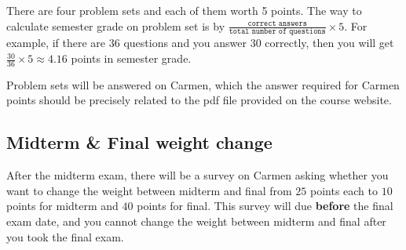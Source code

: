 \documentclass[12pt]{article}
\begin{document}
There are four problem sets and each of them worth 5 points.
The way to calculate semester grade on problem set is by $ \frac{ \texttt{correct answers} }{ \texttt{total number of questions} } \times 5 $.
For example, if there are 36 questions and you answer 30 correctly, then you will get $ \frac{30}{36} \times 5 \approx 4.16$ points in semester grade.


Problem sets will be answered on Carmen, which the answer required for Carmen points should be precisely related to the pdf file provided on the course website.

\subsection*{Midterm \& Final weight change}
\label{sub:Midterm____Final_weight_change}

After the midterm exam, there will be a survey on Carmen asking whether you want to change the weight between midterm and final from $ 25 $ points each to $ 10 $ points for midterm and $ 40  $ points for final.
This survey will due \textbf{before} the final exam date, and you cannot change the weight between midterm and final after you took the final exam.





\end{document}
